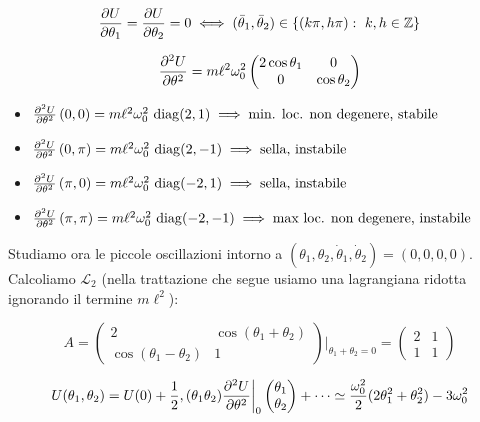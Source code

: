 \begin{equation}
\pdv{U}{\theta_1}=\pdv{U}{\theta_2}=0
\iff (\bar{\theta}_1,\bar{\theta}_2)\in\{(k\pi,h\pi):\ k,h\in\mathbb{Z}\}
\end{equation}

\begin{equation}
\pdv[2]{U}{\theta}(\theta_1,\theta_2)
= m\ell^{2}\omega_0^{2}
\begin{pmatrix}
2\cos\theta_1 & 0\\
0 & \cos\theta_2
\end{pmatrix}
\end{equation}

\begin{itemize}
    \item $\pdv[2]{U}{\theta}\left(0,0\right) = m\ell^2\omega_0^2 \, \operatorname{diag}(2,1) \implies \text{min. loc. non degenere, stabile}$
    \item $\pdv[2]{U}{\theta}\left(0,\pi\right) = m\ell^2\omega_0^2 \, \operatorname{diag}(2,-1) \implies \text{sella, instabile}$
    \item $\pdv[2]{U}{\theta}\left(\pi,0\right) = m\ell^2\omega_0^2 \, \operatorname{diag}(-2,1) \implies \text{sella, instabile}$
    \item $\pdv[2]{U}{\theta}\left(\pi,\pi\right) = m\ell^2\omega_0^2 \, \operatorname{diag}(-2,-1) \implies \text{max loc. non degenere, instabile}$
\end{itemize}

Studiamo ora le piccole oscillazioni intorno a $(\theta_1,\theta_2,\dot{\theta}_1,\dot{\theta}_2)= (0,0,0,0)$.\\
Calcoliamo $\mathcal{L}_2$ (nella trattazione che segue usiamo una lagrangiana ridotta ignorando il termine $m\ell^2$):

\begin{equation}
A=\begin{pmatrix}
2 & \cos(\theta_1+\theta_2)\\
\cos(\theta_1-\theta_2) & 1
\end{pmatrix}\bigg|_{\theta_1+\theta_2=0}
=\begin{pmatrix}
2 & 1\\
1 & 1
\end{pmatrix}
\end{equation}

\begin{equation}
U(\theta_1,\theta_2)=U(0)+\frac{1}{2},(\theta_1\theta_2)
\pdv[2]{U}{\theta}\bigg|_{0}
\begin{pmatrix}\theta_1\\ \theta_2\end{pmatrix}+ \dots
\simeq \frac{\omega_0^2}{2} (2\theta_1^2+\theta_2^2) - 3\omega_0^2
\end{equation}

